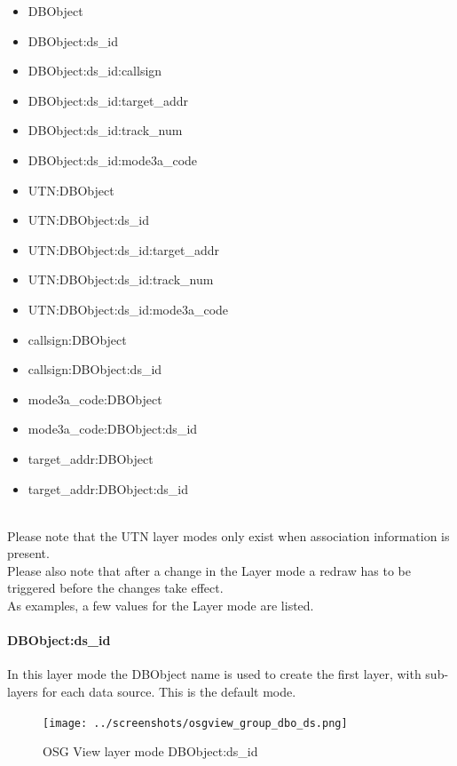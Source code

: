 \begin{itemize}
 \item DBObject
 \item DBObject:ds\_id
 \item DBObject:ds\_id:callsign
 \item DBObject:ds\_id:target\_addr
 \item DBObject:ds\_id:track\_num
 \item DBObject:ds\_id:mode3a\_code
 \item UTN:DBObject
 \item UTN:DBObject:ds\_id
 \item UTN:DBObject:ds\_id:target\_addr
 \item UTN:DBObject:ds\_id:track\_num
 \item UTN:DBObject:ds\_id:mode3a\_code
 \item callsign:DBObject
 \item callsign:DBObject:ds\_id 
 \item mode3a\_code:DBObject
 \item mode3a\_code:DBObject:ds\_id
 \item target\_addr:DBObject
 \item target\_addr:DBObject:ds\_id
\end{itemize}
\  \\

Please note that the UTN layer modes only exist when association information is present. \\

Please also note that after a change in the Layer mode a redraw has to be triggered before the changes take effect. \\

As examples, a few values for the Layer mode are listed. \\

\paragraph{DBObject:ds\_id}

In this layer mode the DBObject name is used to create the first layer, with sub-layers for each data source. This is the default mode.

\begin{figure}[H]
    \center
    \texttt{[image: ../screenshots/osgview\_group\_dbo\_ds.png]}
  \caption{OSG View layer mode DBObject:ds\_id}
\end{figure}

